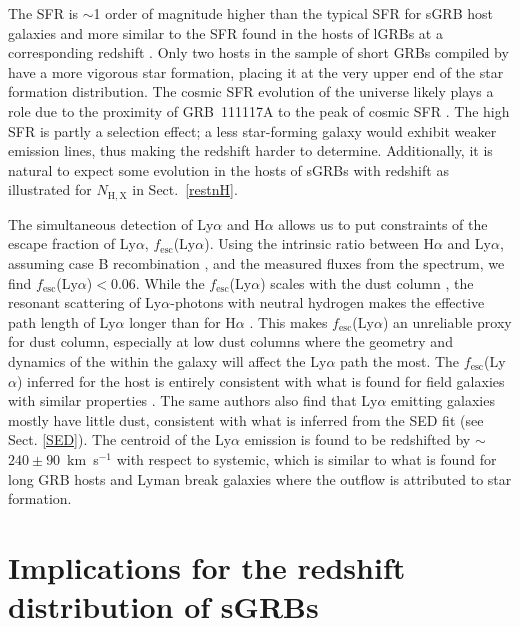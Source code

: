 \documentclass[longauth]{aa}    %
\newcommand{\lya}{Ly$\alpha$}
\newcommand{\ha}{H$\alpha$}
\newcommand{\hi}{\ion{H}{i}}
\begin{document}
The SFR is $\sim$1 order of magnitude higher than the typical SFR for sGRB host
galaxies \citep{Berger2014} and more similar to the SFR found in the hosts of
lGRBs at a corresponding redshift \citep{Kruhler2015}. Only two hosts in the
sample of short GRBs compiled by \citet{Berger2014} have a more vigorous star
formation, placing it  at the very upper end of the star formation
distribution. The cosmic SFR evolution of the universe likely plays a role due
to the proximity of GRB~111117A to the peak of cosmic SFR \citep{Madau2014}.
The high SFR is partly a selection effect;  a less star-forming galaxy
would exhibit weaker emission lines, thus making the redshift harder to
determine. Additionally, it is natural to expect some evolution in the hosts of
sGRBs with redshift as illustrated for $N_\mathrm{H,X}$ in Sect.~\ref{restnH}.

The simultaneous detection of \lya{} and \ha{} allows us to put constraints of
the escape fraction of \lya{}, $f_{\mathrm{esc}}$(\lya). Using the intrinsic
ratio between \ha{} and \lya{}, assuming case B recombination
\citep{Brocklehurst1971}, and the measured fluxes from the spectrum, we find
$f_{\mathrm{esc}}$(\lya)$ < 0.06$. While the $f_{\mathrm{esc}}$(\lya) scales
with the dust column \citep{Hayes2011}, the resonant scattering of
\lya{}-photons with neutral hydrogen makes the effective path length of \lya{}
longer than for \ha{} \citep{Atek2009}. This makes $f_{\mathrm{esc}}$(\lya) an
unreliable proxy for dust column, especially at low dust columns
\citep{Atek2014} where the geometry and dynamics of the \hi{} within the galaxy
will affect the \lya{} path the most. The $f_{\mathrm{esc}}$(\lya) inferred for
the host is entirely consistent with what is found for field galaxies with
similar properties \citep{Oyarzun2017}. The same authors also find that \lya{}
emitting galaxies mostly have  little dust, consistent with what is inferred from
the SED fit (see Sect. \ref{SED}). The centroid of the Ly$\alpha$ emission is
found to be redshifted by $\sim$~$240\pm 90$~km~s$^{-1}$ with respect to
systemic, which is similar to what is found for long GRB hosts
\citep{Milvang-Jensen2012a} and Lyman break galaxies \citep{Shapley2003a} where the outflow is attributed to star formation.

\section{Implications for the redshift distribution of sGRBs}
\end{document}

